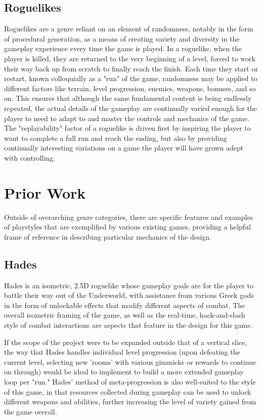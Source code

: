 \documentclass[10pt,twocolumn]{article}
\begin{document}
\subsection{Roguelikes}
Roguelikes are a genre reliant on an element of randomness, notably in the form of procedural generation, as a means of creating variety and diversity in the gameplay experience every time the game is played. In a roguelike, when the player is killed, they are returned to the very beginning of a level, forced to work their way back up from scratch to finally reach the finish. Each time they start or restart, known colloquially as a "run" of the game, randomness may be applied to different factors like terrain, level progression, enemies, weapons, bonuses, and so on. This ensures that although the same fundamental content is being endlessly repeated, the actual details of the gameplay are continually varied enough for the player to need to adapt to and master the controls and mechanics of the game. \cite{roguelikes}The "replayability" factor of a roguelike is driven first by inspiring the player to want to complete a full run and reach the ending, but also by providing continually interesting variations on a game the player will have grown adept with controlling. 


\section{Prior Work} 
Outside of overarching genre categories, there are specific features and examples of playstyles that are exemplified by various existing games, providing a helpful frame of reference in describing particular mechanics of the design. 

\subsection {Hades}
Hades is an isometric, 2.5D roguelike whose gameplay goals are for the player to battle their way out of the Underworld, with assistance from various Greek gods in the form of unlockable effects that modify different aspects of combat. The overall isometric framing of the game, as well as the real-time, hack-and-slash style of combat interactions are aspects that feature in the design for this game. \cite{hades}

If the scope of the project were to be expanded outside that of a vertical slice, the way that Hades handles individual level progression (upon defeating the current level, selecting new 'rooms' with various gimmicks or rewards to continue on through) would be ideal to implement to build a more extended gameplay loop per "run." Hades' method of meta-progression is also well-suited to the style of this game, in that resources collected during gameplay can be used to unlock different weapons and abilities, further increasing the level of variety gained from the game overall.
\end{document}
